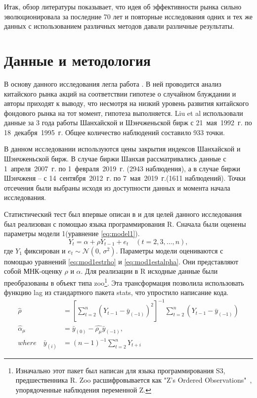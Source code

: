 \documentclass[a4paper,12pt]{article}
\begin{document}
Итак, обзор литературы показывает, что идея об эффективности рынка сильно эволюционировала за последние 70 лет и повторные исследования одних и тех же данных с использованием различных методов давали различные результаты.

\section{Данные и методология}

В основу данного исследования легла работа \cite{Liu1997}. В ней проводится анализ китайского рынка акций на соответствии гипотезе о случайном блуждании и авторы приходят к выводу, что несмотря на низкий уровень развития китайского фондового рынка на тот момент, гипотеза выполняется. Liu et al использовали данные за 3 года работы Шанхайской и Шэнчженьской бирж с 21~мая~1992~г. по 18~декабря~1995~г. Общее количество наблюдений составило 933 точки.

В данном исследовании используются цены закрытия индексов Шанхайской и Шэнчженьской бирж. В случае биржи Шанхая рассматривались данные с 1~апреля~2007~г. по 1~февраля~2019~г. (2943 наблюдения), а в случае биржи Шэнчженя -- с 14~сентября~2012~г. по 7~мая~2019~г.(1611 наблюдений). Точки отсечения были выбраны исходя из доступности данных и момента начала исследования.

Статистический тест был впервые описан в \cite{Dickey1981} и для целей данного исследования был реализован с помощью языка программирования R. Сначала были оценены параметры модели 1(уравнение \ref{eq:model1}).
\begin{equation}
  Y_t=\alpha+\rho Y_{t-1}+e_t\quad (t=2,3,\ldots,n),
\label{eq:model1}
\end{equation}
где $Y_1$ фиксирован и $e_t \sim \mathcal{N}(0,\,\sigma^{2})$. Параметры модели оцениваются с помощью уравнений \ref{eq:mod1estrho} и \ref{eq:mod1estalpha}. Они представляют собой МНК-оценку $\rho$ и $\alpha$. Для реализации в R исходные данные были преобразованы в объект типа zoo\footnote{Изначально этот пакет был написан для языка программирования S3, предшественника R. Zoo расшифровывается как "Z's Ordered Observations"\ , упорядоченные наблюдения переменной Z.}. Эта трансформация позволила использовать функцию lag из стандартного пакета stats, что упростило написание кода.
\begin{align}
  \label{eq:mod1estrho}
  \hat{\rho}&=\left[\sum_{t=2}^n (Y_{t-1}-\bar{y}_{(-1)})^2\right]^{-1}
  \sum_{t=2}^n \left(Y_{t-1}-\bar{y}_{(-1)}\right)\\
  \label{eq:mod1estalpha}
  \hat{\alpha}_\mu&=\bar{y}_{(0)}-\hat{\rho_\mu}\bar{y}_{(-1)},\\
where\quad
  \bar{y}_{(i)}&=(n-1)^{-1}\sum_{t=2}^{n}Y_{t+i}
\end{align}
\end{document}
